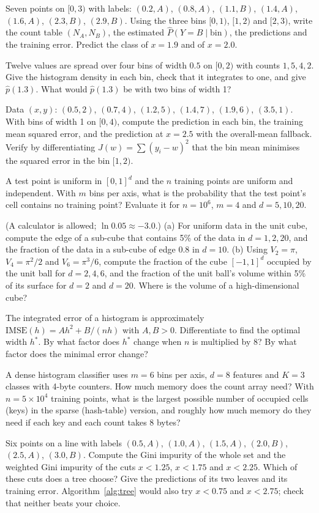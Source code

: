 \documentclass[11pt]{article}
\begin{document}
\begin{questions}
\begin{calculations}
\item Seven points on $[0, 3)$ with labels: $(0.2, A)$, $(0.8, A)$, $(1.1, B)$, $(1.4, A)$, $(1.6, A)$, $(2.3, B)$,
$(2.9, B)$.
Using the three bins $[0, 1)$, $[1, 2)$ and $[2, 3)$, write the count table $(N_A, N_B)$, the estimated $\hat P(Y = B \mid \text{bin})$, the
predictions and the training error. Predict the class of $x = 1.9$ and of $x = 2.0$.
\item Twelve values are spread over four bins of width $0.5$ on $[0, 2)$ with counts $1, 5, 4, 2$. Give the histogram
density in each bin, check that it integrates to one, and give $\hat p(1.3)$. What would $\hat p(1.3)$ be with two bins
of width 1?
\item Data $(x, y)$: $(0.5, 2)$, $(0.7, 4)$, $(1.2, 5)$, $(1.4, 7)$, $(1.9, 6)$, $(3.5, 1)$. With bins of width 1 on
$[0, 4)$, compute the prediction in each bin, the training mean squared error, and the prediction at $x = 2.5$ with
the overall-mean fallback. Verify by differentiating $J(w) = \sum (y_i - w)^2$ that the bin mean minimises the squared
error in the bin $[1, 2)$.
\item A test point is uniform in $[0, 1]^d$ and the $n$ training points are uniform and independent. With $m$ bins per
axis, what is the probability that the test point's cell contains no training point? Evaluate it for $n = 10^6$,
$m = 4$ and $d = 5, 10, 20$.
\item (A calculator is allowed; $\ln 0.05 \approx -3.0$.) (a) For uniform data in the unit cube, compute the edge of a sub-cube that contains 5\% of the data in
$d = 1, 2, 20$, and the fraction of the data in a sub-cube of edge $0.8$ in $d = 10$. (b) Using $V_2 = \pi$,
$V_4 = \pi^2/2$ and $V_6 = \pi^3/6$, compute the fraction of the cube $[-1, 1]^d$ occupied by the unit ball for
$d = 2, 4, 6$, and the fraction of the unit ball's volume within 5\% of its surface for $d = 2$ and $d = 20$. Where is
the volume of a high-dimensional cube?
\item The integrated error of a histogram is approximately $\mathrm{IMSE}(h) = A h^2 + B/(nh)$ with $A, B > 0$.
Differentiate to find the optimal width $h^*$. By what factor does $h^*$ change when $n$ is multiplied by 8? By what
factor does the minimal error change?
\item A dense histogram classifier uses $m = 6$ bins per axis, $d = 8$ features and $K = 3$ classes with 4-byte
counters. How much memory does the count array need? With $n = 5 \times 10^4$ training points, what is the largest
possible number of occupied cells (keys) in the sparse (hash-table) version, and roughly how much memory do they need
if each key and each count takes 8 bytes?
\item Six points on a line with labels $(0.5, A)$, $(1.0, A)$, $(1.5, A)$, $(2.0, B)$, $(2.5, A)$, $(3.0, B)$. Compute
the Gini impurity of the whole set and the weighted Gini impurity of the cuts $x < 1.25$, $x < 1.75$ and $x < 2.25$.
Which of these cuts does a tree choose? Give the predictions of its two leaves and its training error.
Algorithm~\ref{alg:tree} would also try $x < 0.75$ and $x < 2.75$; check that neither beats your choice.
\end{calculations}


\end{questions}
\end{document}
